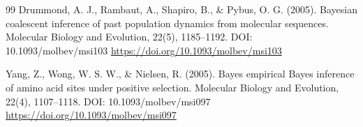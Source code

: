 \documentclass[10pt,letterpaper]{article}
\begin{document}
\begin{thebibliography}{99}
 Drummond, A. J., Rambaut, A., Shapiro, B., \& Pybus, O. G. (2005). Bayesian coalescent inference of past population dynamics from molecular sequences. Molecular Biology and Evolution, 22(5), 1185--1192. DOI: 10.1093/molbev/msi103 \url{https://doi.org/10.1093/molbev/msi103}

 Yang, Z., Wong, W. S. W., \& Nielsen, R. (2005). Bayes empirical Bayes inference of amino acid sites under positive selection. Molecular Biology and Evolution, 22(4), 1107--1118. DOI: 10.1093/molbev/msi097 \url{https://doi.org/10.1093/molbev/msi097}

\end{thebibliography}
\end{document}

